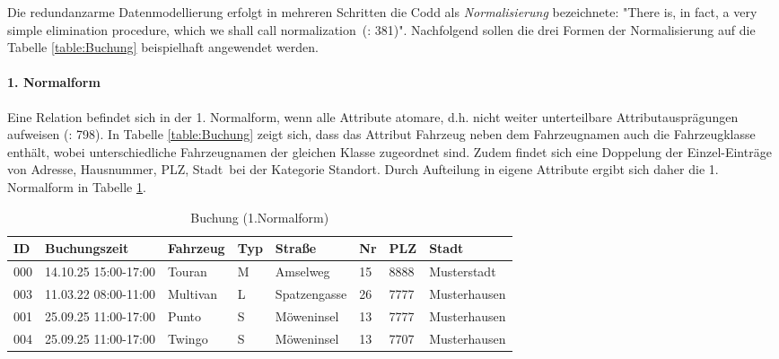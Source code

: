 Die redundanzarme Datenmodellierung erfolgt in mehreren Schritten die Codd als \textit{Normalisierung} bezeichnete: "There is, in fact, a very simple elimination procedure, which we shall call normalization\  (\cite{coddRelationalModelData1970}: 381)". Nachfolgend sollen die drei Formen der Normalisierung auf die Tabelle \ref{table:Buchung} beispielhaft angewendet werden.

\paragraph{1. Normalform}
Eine Relation befindet sich in der 1. Normalform, wenn alle Attribute atomare, d.h. nicht weiter unterteilbare Attributausprägungen aufweisen (\cite{gehringWirtschaftsinformatik2022}: 798). In Tabelle \ref{table:Buchung} zeigt sich, dass das Attribut Fahrzeug neben dem Fahrzeugnamen auch die Fahrzeugklasse enthält, wobei unterschiedliche Fahrzeugnamen der gleichen Klasse zugeordnet sind. Zudem findet sich eine Doppelung der Einzel-Einträge von \glqq Adresse, Hausnummer, PLZ, Stadt\grqq\ bei der Kategorie Standort. Durch Aufteilung in eigene Attribute ergibt sich daher die 1. Normalform in Tabelle \ref{table:1NF:Buchung}.

\begin{table}[!ht]
	
	\centering
	\caption{Buchung (1.Normalform)}\label{table:1NF:Buchung}
	\begin{tabular}{llllllll} \toprule
		ID 	& Buchungszeit & Fahrzeug & Typ & Stra\ss e & Nr & PLZ & Stadt \\ 
		\midrule
		000 & 14.10.25 15:00-17:00 & Touran & M & Amselweg & 15 & 8888 & Musterstadt \\
		003 & 11.03.22 08:00-11:00 & Multivan & L & Spatzengasse & 26 & 7777 & Musterhausen \\
		001 & 25.09.25 11:00-17:00 & Punto & S & Möweninsel & 13 & 7777 & Musterhausen \\
		004 & 25.09.25 11:00-17:00 & Twingo & S & Möweninsel & 13 & 7707 & Musterhausen \\
		\bottomrule
	\end{tabular}
\end{table}

